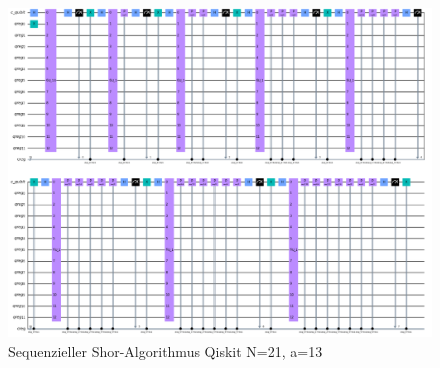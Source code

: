 \documentclass[lettersize,journal]{IEEEtran}
\begin{document}
\begin{figure}[p]
\centering
\caption{Sequenzieller Shor-Algorithmus Qiskit N=21, a=13}
\label{fig:QiskitN1a13}
\includegraphics[height=\linewidth,angle=90]{qiskit_Shor_21_a13.PNG}
\end{figure}
\end{document}
